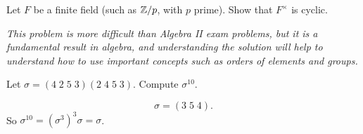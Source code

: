 
\question 
Let $F$ be a finite field
(such as $\mathbb{Z}/p$, with $p$ prime).
Show that $F^\times$ is cyclic.

\emph{This problem is more difficult than Algebra II exam problems,
but it is a fundamental result in algebra, and understanding the solution
will help to understand how to use important concepts such as orders of elements and groups.}

\begin{solution}
    
\end{solution}

\question 
Let $\sigma = (4\;2\;5\;3)(2\;4\;5\;3)$.
Compute $\sigma^{10}$.

\begin{solution}
    \[
        \sigma = (3\;5\;4).
    \]
    So $\sigma^{10} = (\sigma^3)^3\sigma = \sigma$.
\end{solution}

